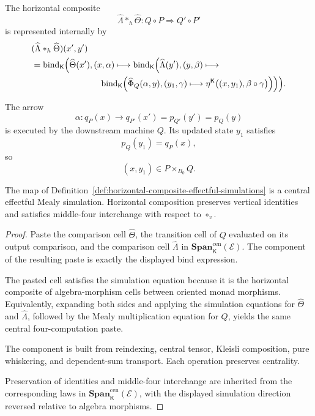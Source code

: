 \begin{definition}
\label{def:horizontal-composite-effectful-simulations}
The horizontal composite
\[
    \widehat\Lambda\ast_h\widehat\Theta:
    Q\circ P
    \Rightarrow
    Q'\circ P'
\]
is represented internally by
\[
\begin{aligned}
&
(\widehat\Lambda\ast_h\widehat\Theta)(x',y')
\\
&=
\operatorname{bind}_{\mathsf K}
\Bigl(
    \widehat\Theta(x'),
    (x,\alpha)
    \longmapsto
    \operatorname{bind}_{\mathsf K}
    \Bigl(
        \widehat\Lambda(y'),
        (y,\beta)
        \longmapsto
\\
&\hspace{8em}
        \operatorname{bind}_{\mathsf K}
        \Bigl(
            \widehat\Phi_Q(\alpha,y),
            (y_1,\gamma)
            \longmapsto
            \eta^{\mathsf K}
            \bigl(
                (x,y_1),
                \beta\circ\gamma
            \bigr)
        \Bigr)
    \Bigr)
\Bigr).
\end{aligned}
\]
\end{definition}

The arrow
\[
    \alpha:q_P(x)\to q_{P'}(x')=p_{Q'}(y')=p_Q(y)
\]
is executed by the downstream machine \(Q\).  Its updated state \(y_1\)
satisfies
\[
    p_Q(y_1)=q_P(x),
\]
so
\[
    (x,y_1)\in P\times_{B_0}Q.
\]

\begin{proposition}
\label{prop:horizontal-effectful-simulation-law}
The map of
Definition~\ref{def:horizontal-composite-effectful-simulations} is a central
effectful Mealy simulation.  Horizontal composition preserves vertical
identities and satisfies middle-four interchange with respect to
\(\circ_v\).
\end{proposition}

\begin{proof}
Paste the comparison cell \(\widehat\Theta\), the transition cell of \(Q\)
evaluated on its output comparison, and the comparison cell
\(\widehat\Lambda\) in
\(\mathbf{Span}^{\mathrm{cen}}_{\mathsf K}(\mathcal E)\).  The component of
the resulting paste is exactly the displayed bind expression.

The pasted cell satisfies the simulation equation because it is the
horizontal composite of algebra-morphism cells between oriented monad
morphisms.  Equivalently, expanding both sides and applying the simulation
equations for \(\widehat\Theta\) and \(\widehat\Lambda\), followed by the
Mealy multiplication equation for \(Q\), yields the same central
four-computation paste.

The component is built from reindexing, central tensor, Kleisli composition,
pure whiskering, and dependent-sum transport.  Each operation preserves
centrality.

Preservation of identities and middle-four interchange are inherited from
the corresponding laws in
\(\mathbf{Span}^{\mathrm{cen}}_{\mathsf K}(\mathcal E)\), with the displayed
simulation direction reversed relative to algebra morphisms.
\end{proof}

